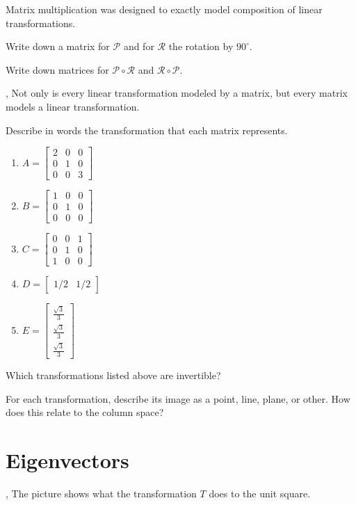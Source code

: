 \documentclass{article}
\newcommand{\mat}[1]{\begin{bmatrix}#1\end{bmatrix}}
\begin{document}
Matrix multiplication was designed to exactly model composition of linear transformations.
\begin{Enum}[resume]
	\item Write down a matrix for $\mathcal P$ and for $\mathcal R$ the rotation
		by $90^\circ$.
	\item Write down matrices for $\mathcal P\circ\mathcal R$ and $\mathcal R\circ \mathcal P$.
\end{Enum}

\sep
Not only is every linear transformation modeled by a matrix, but every matrix models a linear
transformation.

\begin{Enum}
	\item Describe in words the transformation that each matrix represents.
		\begin{enumerate}
			\item $A=\mat{2&0&0\\0&1&0\\0&0&3}$
			\item $B=\mat{1&0&0\\0&1&0\\0&0&0}$
			\item $C=\mat{0&0&1\\0&1&0\\1&0&0}$
			\item $D=\mat{1/2&1/2}$
			\item $E=\mat{\frac{\sqrt{3}}{3}\\\frac{\sqrt{3}}{3}\\\frac{\sqrt{3}}{3}}$
		\end{enumerate}
	\item Which transformations listed above are invertible?
	\item For each transformation, describe its image as a point, line,
		plane, or other.  How does this relate to the column space?
\end{Enum}

\newpage
\section*{Eigenvectors}
	\sep
	The picture shows what the transformation $T$ does to the unit square.
\end{document}
